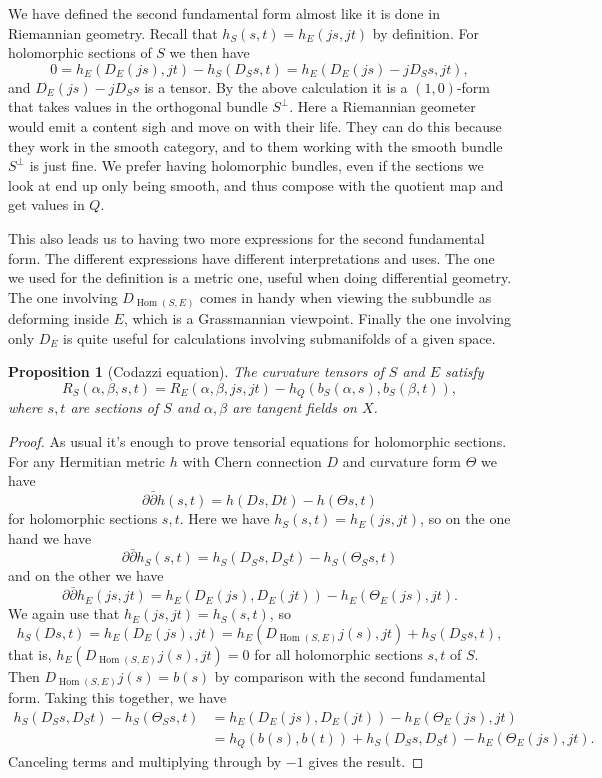 \documentclass[11pt]{article}
\newtheorem{prop}[theo]{Proposition}
\newtheorem*{proof}{Proof}
\DeclareMathOperator{\Hom}{Hom}
\begin{document}
We have defined the second fundamental form almost like it is done in Riemannian geometry. Recall that $h_S(s,t) = h_E(js,jt)$ by definition. For holomorphic sections of $S$ we then have
\[
0
= h_E(D_E(js), jt) - h_S(D_Ss,t)
= h_E(D_E(js) - jD_Ss, jt),
\]
and $D_E(js) - jD_Ss$ is a tensor. By the above calculation it is a $(1,0)$-form that takes values in the orthogonal bundle $S^\perp$. Here a Riemannian geometer would emit a content sigh and move on with their life. They can do this because they work in the smooth category, and to them working with the smooth bundle $S^\perp$ is just fine. We prefer having holomorphic bundles, even if the sections we look at end up only being smooth, and thus compose with the quotient map and get values in $Q$.

This also leads us to having two more expressions for the second fundamental form. The different expressions have different interpretations and uses. The one we used for the definition is a metric one, useful when doing differential geometry. The one involving $D_{\Hom(S,E)}$ comes in handy when viewing the subbundle as deforming inside $E$, which is a Grassmannian viewpoint. Finally the one involving only $D_E$ is quite useful for calculations involving submanifolds of a given space.


\begin{prop}[Codazzi equation]
\label{prop:codazzi-equation}
The curvature tensors of $S$ and $E$ satisfy
\[
R_S(\alpha,\beta,s,t)
= R_{E}(\alpha,\beta,js,jt)
- h_Q(b_S(\alpha,s), b_S(\beta,t)),
\]
where $s, t$ are sections of $S$ and $\alpha,\beta$ are tangent fields on $X$.
\end{prop}

\begin{proof}
As usual it's enough to prove tensorial equations for holomorphic sections. For any Hermitian metric $h$ with Chern connection $D$ and curvature form $\Theta$ we have
$$
\partial\bar\partial h(s,t)
= h(Ds,Dt) - h(\Theta s, t)
$$
for holomorphic sections $s,t$. Here we have $h_S(s,t) = h_E(js, jt)$, so on the one hand we have
$$
\partial\bar\partial h_S(s,t) =
h_S(D_S s, D_S t) - h_S(\Theta_S s, t)
$$
and on the other we have
$$
\partial\bar\partial h_E(js, jt)
= h_E(D_E(js), D_E(jt)) - h_E(\Theta_E (js), jt).
$$
We again use that $h_E(js,jt) = h_S(s,t)$, so
$$
h_S(Ds,t)
= h_E(D_E(js), jt)
= h_E(D_{\Hom(S,E)}j(s), jt) + h_S(D_S s,t),
$$
that is, $h_E(D_{\Hom(S,E)}j(s), jt) = 0$ for all holomorphic sections $s, t$ of $S$. Then $D_{\Hom(S,E)}j(s) = b(s)$ by comparison with the second fundamental form. Taking this together, we have
\begin{align*}
h_S(D_S s, D_S t) - h_S(\Theta_S s, t)
&= h_E(D_E(js), D_E(jt)) - h_E(\Theta_E (js), jt)
\\
&= h_Q(b(s),b(t)) + h_S(D_S s, D_S t) - h_E(\Theta_E (js), jt).
\end{align*}
Canceling terms and multiplying through by $-1$ gives the result.
\end{proof}
\end{document}
